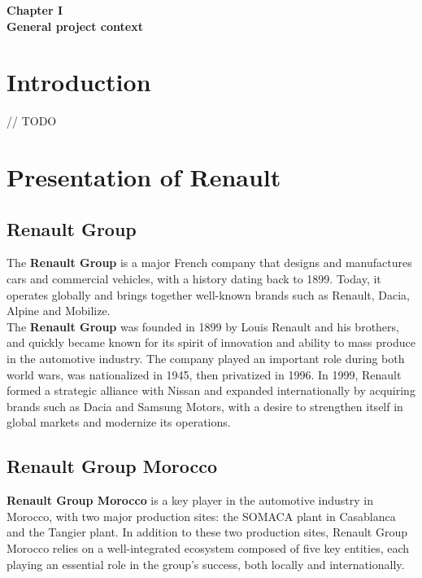 
\vspace*{9cm}
\begin{doublespace}
    \centering
    \textbf{ \huge Chapter I \\ [1 cm] General project context}
\end{doublespace} 

\newpage
\fancyhead[R]{\rightmark}

\doublespacing

\section*{Introduction}

// TODO

\section{Presentation of Renault}

\subsection{Renault Group}
The \textbf{Renault Group} is a major French company that designs and manufactures cars and commercial vehicles, with a history dating back to 1899. Today, it operates globally and brings together well-known brands such as Renault, Dacia, Alpine and Mobilize. \\

\noindent
The \textbf{Renault Group} was founded in 1899 by Louis Renault and his brothers, and quickly became known for its spirit of innovation and ability to mass produce in the automotive industry. The company played an important role during both world wars, was nationalized in 1945, then privatized in 1996. In 1999, Renault formed a strategic alliance with Nissan and expanded internationally by acquiring brands such as Dacia and Samsung Motors, with a desire to strengthen itself in global markets and modernize its operations.


\subsection{Renault Group Morocco}
\textbf{Renault Group Morocco} is a key player in the automotive industry in Morocco, with two major production sites: the SOMACA plant in Casablanca and the Tangier plant.
In addition to these two production sites, Renault Group Morocco relies on a well-integrated ecosystem composed of five key entities, each playing an essential role in the group's success, both locally and internationally.


